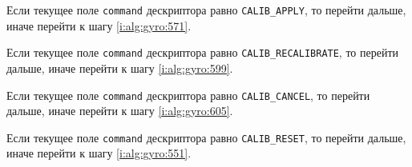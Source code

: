 \begin{enumerate_step}
    \item \label{i:alg:gyro:566} Если текущее поле \lstinline|command| дескриптора равно \lstinline|CALIB_APPLY|, то перейти дальше, иначе перейти к шагу
    \ref{i:alg:gyro:571}.

    \item \label{i:alg:gyro:571} Если текущее поле \lstinline|command| дескриптора равно \lstinline|CALIB_RECALIBRATE|, то перейти дальше, иначе перейти к шагу
    \ref{i:alg:gyro:599}.

    \item \label{i:alg:gyro:599} Если текущее поле \lstinline|command| дескриптора равно \lstinline|CALIB_CANCEL|, то перейти дальше, иначе перейти к шагу
    \ref{i:alg:gyro:605}.

    \item \label{i:alg:gyro:605} Если текущее поле \lstinline|command| дескриптора равно \lstinline|CALIB_RESET|, то перейти дальше, иначе перейти к шагу
    \ref{i:alg:gyro:551}.

\end{enumerate_step}


